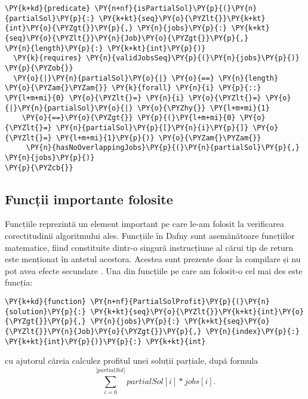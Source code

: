 \begin{itemize}
\begin{Verbatim}[commandchars=\\\{\}, fontsize=\footnotesize]
\PY{k+kd}{predicate} \PY{n+nf}{isPartialSol}\PY{p}{(}\PY{n}{partialSol}\PY{p}{:} \PY{k+kt}{seq}\PY{o}{\PYZlt{}}\PY{k+kt}{int}\PY{o}{\PYZgt{}}\PY{p}{,} \PY{n}{jobs}\PY{p}{:} \PY{k+kt}{seq}\PY{o}{\PYZlt{}}\PY{n}{Job}\PY{o}{\PYZgt{}}\PY{p}{,} 
\PY{n}{length}\PY{p}{:} \PY{k+kt}{int}\PY{p}{)}
  \PY{k}{requires} \PY{n}{validJobsSeq}\PY{p}{(}\PY{n}{jobs}\PY{p}{)}
\PY{p}{\PYZob{}}   
  \PY{o}{|}\PY{n}{partialSol}\PY{o}{|} \PY{o}{==} \PY{n}{length} \PY{o}{\PYZam{}\PYZam{}} \PY{k}{forall} \PY{n}{i} \PY{p}{::} \PY{l+m+mi}{0} \PY{o}{\PYZlt{}=} \PY{n}{i} \PY{o}{\PYZlt{}=} \PY{o}{|}\PY{n}{partialSol}\PY{o}{|} \PY{o}{\PYZhy{}} \PY{l+m+mi}{1}
    \PY{o}{==}\PY{o}{\PYZgt{}} \PY{p}{(}\PY{l+m+mi}{0} \PY{o}{\PYZlt{}=} \PY{n}{partialSol}\PY{p}{[}\PY{n}{i}\PY{p}{]} \PY{o}{\PYZlt{}=} \PY{l+m+mi}{1}\PY{p}{)} \PY{o}{\PYZam{}\PYZam{}}
     \PY{n}{hasNoOverlappingJobs}\PY{p}{(}\PY{n}{partialSol}\PY{p}{,} \PY{n}{jobs}\PY{p}{)}
\PY{p}{\PYZcb{}}
\end{Verbatim}
\end{itemize}


\subsection{Funcții importante folosite}
Funcțiile reprezintă un element important pe care le-am folosit la verificarea corectitudinii algoritmului ales. 
Funcțiile în Dafny sunt asemănătoare funcțiilor matematice, fiind constituite dintr-o singură instrucțiune al cărui tip de return este menționat în antetul acestora. Acestea sunt prezente doar
la compilare și nu pot avea efecte secundare \citep{DBLP:journals/jlap/BlazquezMS23}.
Una din funcțiile pe care am folosit-o cel mai des este funcția: 

\begin{Verbatim}[commandchars=\\\{\},fontsize=\footnotesize]
\PY{k+kd}{function} \PY{n+nf}{PartialSolProfit}\PY{p}{(}\PY{n}{solution}\PY{p}{:} \PY{k+kt}{seq}\PY{o}{\PYZlt{}}\PY{k+kt}{int}\PY{o}{\PYZgt{}}\PY{p}{,} \PY{n}{jobs}\PY{p}{:} \PY{k+kt}{seq}\PY{o}{\PYZlt{}}\PY{n}{Job}\PY{o}{\PYZgt{}}\PY{p}{,} \PY{n}{index}\PY{p}{:} \PY{k+kt}{int}\PY{p}{)}\PY{p}{:} \PY{k+kt}{int}
\end{Verbatim}
cu ajutorul căreia calculez profitul unei soluții parțiale, după formula \[ \sum_{i=0}^{|partialSol|} partialSol[i] * jobs[i]. \]

